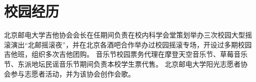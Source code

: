 \documentclass[11pt,a4paper]{moderncv}
\begin{document}
\section{校园经历} %
{北京邮电大学吉他协会会长}{}{}{}{在任期间负责在校内科学会堂策划举办三次校园大型摇滚演出“北邮摇滚夜”，并在北京各酒吧合作举办过校园摇滚专场，开设过多期校园吉他班，组织多次吉他团购。}
{音乐节校园票务代理}{}{}{}{在摩登天空音乐节、草莓音乐节、东派地坛民谣音乐节期间负责本校学生票代售。}
{北京邮电大学阳光志愿者协会}{}{}{}{参与志愿者活动，并为该协会创作会歌。}

\closesection{}                   %
\renewcommand{\listitemsymbol}{-} %

\nocite{*}


\end{document}
